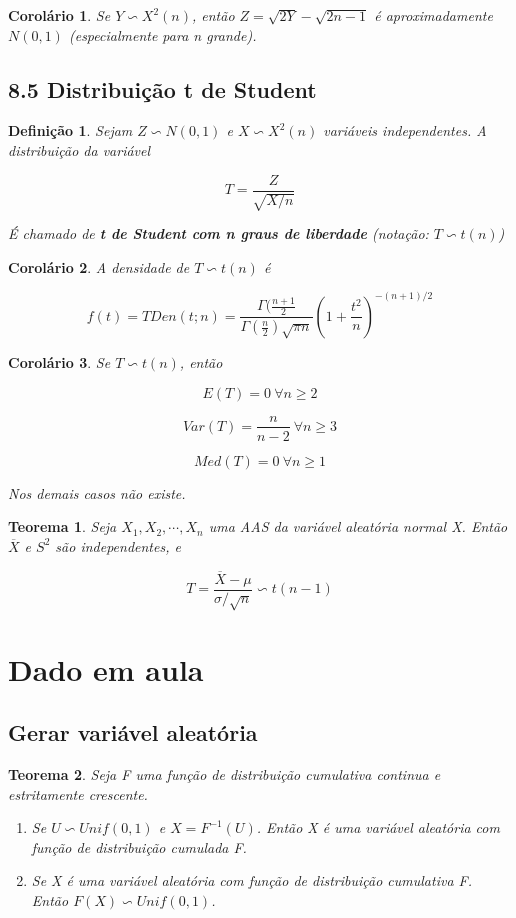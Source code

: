 \documentclass[12pt]{article}
\newtheorem{theorem}{Teorema}[section]
\newtheorem{corollary}{Corolário}[theorem]
\newtheorem{definition}{Definição}
\begin{document}
\begin{corollary}
    Se $Y \backsim X^2(n)$, então $Z = \sqrt{2 Y} - \sqrt{2 n - 1}$ é aproximadamente $N(0, 1)$ (especialmente para n grande).
\end{corollary}

\subsection*{8.5 Distribuição t de Student}
\label{s40}

\begin{definition}
    Sejam $Z \backsim N(0, 1)$ e $X \backsim X^2(n)$ variáveis independentes. A distribuição da variável
    
    $$T = \frac{Z}{\sqrt{X/n}}$$
    
    É chamado de \textbf{t de Student com n graus de liberdade} (notação: $T \backsim t(n)$)
\end{definition}

\begin{corollary}
    A densidade de $T \backsim t(n)$ é
    
    $$f(t) = TDen(t; n) = \frac{\Gamma(\frac{n+1}{2}}{\Gamma (\frac{n}{2}) \sqrt{\pi n}} \left (1 + \frac{t^2}{n} \right) ^{-(n+ 1)/2}$$
\end{corollary}

\begin{corollary}
    Se $T \backsim t(n)$, então 
    
    $$E(T) = 0 \ \forall n \geq 2$$
    
    $$Var(T) = \frac{n}{n-2} \ \forall n \geq 3$$
    
    $$Med(T) = 0 \ \forall n \geq 1$$
    
    Nos demais casos não existe.
\end{corollary}

\begin{theorem}
    Seja $X_1, X_2, \cdots, X_n$ uma AAS da variável aleatória normal X. Então $\overline{X}$ e $S^2$ são independentes, e
    
    $$T = \frac{\overline{X} - \mu}{\sigma / \sqrt{n}} \backsim t(n - 1)$$
\end{theorem}

\section*{Dado em aula}
\subsection*{Gerar variável aleatória}
\begin{theorem}
    Seja F uma função de distribuição cumulativa continua e estritamente crescente.
    \begin{enumerate}
        \item Se $U \backsim Unif(0, 1)$ e $X = F^{-1} (U)$. Então X é uma variável aleatória com função de distribuição cumulada F.
        
        \item Se X é uma variável aleatória com função de distribuição cumulativa F. Então $F(X) \backsim Unif(0, 1)$.
    \end{enumerate}
\end{theorem}
\end{document}
